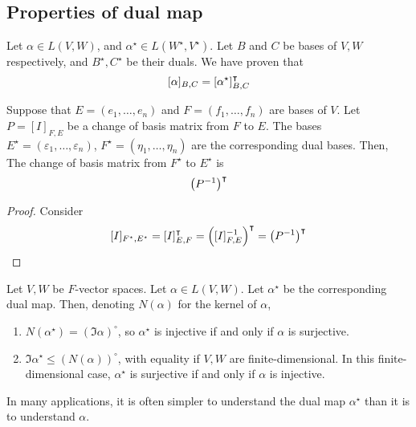\subsection{Properties of dual map}
Let \( \alpha \in L(V,W) \), and \( \alpha^\star \in L(W^\star, V^\star) \).
Let \( B \) and \( C \) be bases of \( V, W \) respectively, and \( B^\star, C^\star \) be their duals.
We have proven that
\[
	[\alpha]_{B,C} = [\alpha^\star]^\intercal_{B,C}
\]
\begin{lemma}
	Suppose that \( E = (e_1, \dots, e_n) \) and \( F = (f_1, \dots, f_n) \) are bases of \( V \).
	Let \( P = [I]_{F, E} \) be a change of basis matrix from \( F \) to \( E \).
	The bases \( E^\star = (\varepsilon_1, \dots, \varepsilon_n) \), \( F^\star = (\eta_1, \dots, \eta_n) \) are the corresponding dual bases.
	Then,
	The change of basis matrix from \( F^\star \) to \( E^\star \) is
	\[
		\qty(P^{-1})^\intercal
	\]
\end{lemma}
\begin{proof}
	Consider
	\[
		[I]_{F^\star, E^\star} = [I]^\intercal_{E, F} = \qty([I]_{F, E}^{-1})^\intercal = \qty(P^{-1})^\intercal
	\]
\end{proof}
\begin{lemma}
	Let \( V, W \) be \( F \)-vector spaces.
	Let \( \alpha \in L(V, W) \).
	Let \( \alpha^\star \) be the corresponding dual map.
	Then, denoting \( N(\alpha) \) for the kernel of \( \alpha \),
	\begin{enumerate}
		\item \( N(\alpha^\star) = (\Im \alpha)^\circ \), so \( \alpha^\star \) is injective if and only if \( \alpha \) is surjective.
		\item \( \Im \alpha^\star \leq (N(\alpha))^\circ \), with equality if \( V, W \) are finite-dimensional.
		      In this finite-dimensional case, \( \alpha^\star \) is surjective if and only if \( \alpha \) is injective.
	\end{enumerate}
\end{lemma}
\begin{remark}
	In many applications, it is often simpler to understand the dual map \( \alpha^\star \) than it is to understand \( \alpha \).
\end{remark}

